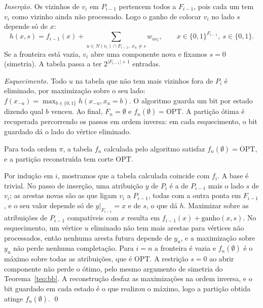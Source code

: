 \emph{Inserção.} Os vizinhos de $v_i$ em $P_{i-1}$ pertencem todos a $F_{i-1}$, pois cada um tem $v_i$ como vizinho ainda não processado. Logo o ganho de colocar $v_i$ no lado $s$ depende só de $x$:
\begin{equation}
  h(x,s)=f_{i-1}(x)+\sum_{u\in N(v_i)\cap F_{i-1},\ x_u\ne s} w_{uv_i},\qquad x\in\{0,1\}^{F_{i-1}},\ s\in\{0,1\}.
\end{equation}
Se a fronteira está vazia, $v_i$ abre uma componente nova e fixamos $s=0$ (simetria). A tabela passa a ter $2^{|F_{i-1}|+1}$ entradas.

\emph{Esquecimento.} Todo $u$ na tabela que não tem mais vizinhos fora de $P_i$ é eliminado, por maximização sobre o seu lado: $f(x_{-u})=\max_{b\in\{0,1\}} h(x_{-u},x_u{=}b)$. O algoritmo guarda um bit por estado dizendo qual $b$ venceu. Ao final, $F_n=\emptyset$ e $f_n(\emptyset)=\mathrm{OPT}$. A partição ótima é recuperada percorrendo os passos em ordem inversa: em cada esquecimento, o bit guardado dá o lado do vértice eliminado.

\begin{teorema}[Correção]\label{teo:dp}
Para toda ordem $\pi$, a tabela $f_n$ calculada pelo algoritmo satisfaz $f_n(\emptyset)=\mathrm{OPT}$, e a partição reconstruída tem corte $\mathrm{OPT}$.
\end{teorema}
\begin{prova}
Por indução em $i$, mostramos que a tabela calculada coincide com $f_i$. A base é trivial. No passo de inserção, uma atribuição $y$ de $P_i$ é a de $P_{i-1}$ mais o lado $s$ de $v_i$; as arestas novas são as que ligam $v_i$ a $P_{i-1}$, todas com a outra ponta em $F_{i-1}$, e o seu valor depende só de $y|_{F_{i-1}}=x$ e de $s$, o que dá $h$. Maximizar sobre as atribuições de $P_{i-1}$ compatíveis com $x$ resulta em $f_{i-1}(x)+\text{ganho}(x,s)$. No esquecimento, um vértice $u$ eliminado não tem mais arestas para vértices não processados, então nenhuma aresta futura depende de $y_u$, e a maximização sobre $y_u$ não perde nenhuma completação. Para $i=n$ a fronteira é vazia e $f_n(\emptyset)$ é o máximo sobre todas as atribuições, que é $\mathrm{OPT}$. A restrição $s=0$ ao abrir componente não perde o ótimo, pelo mesmo argumento de simetria do Teorema~\ref{teo:bb}. A reconstrução desfaz as maximizações na ordem inversa, e o bit guardado em cada estado é o que realizou o máximo, logo a partição obtida atinge $f_n(\emptyset)$. \qed
\end{prova}

